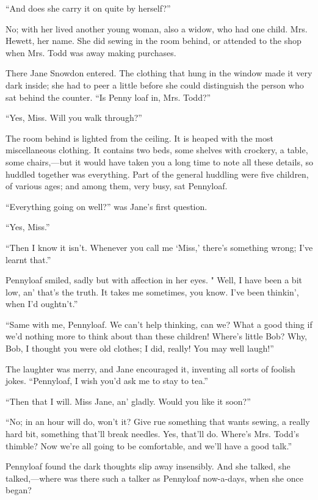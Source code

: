 ``And does she carry it on quite by herself?''

No; with her lived another young woman, also a widow, who had one child.
Mrs. Hewett, her name. She did sewing in the room behind, or attended to
the shop when Mrs. Todd was away making purchases.

There Jane Snowdon entered. The clothing that hung in the window made it
very dark inside; she had to peer a little before she could distinguish
the person who sat behind the counter. ``Is Penny loaf in, Mrs. Todd?''

``Yes, Miss. Will you walk through?''

The room behind is lighted from the ceiling. It is heaped with the most
miscellaneous clothing. It contains two beds, some shelves with
crockery, a table, some chairs,---but it would have taken you a long
time to note all these {}details, so huddled together was everything.
Part of the general huddling were five children, of various ages; and
among them, very busy, sat Pennyloaf.

``Everything going on well?'' was Jane's first question.

``Yes, Miss.''

``Then I know it isn't. Whenever you call me `Miss,' there's something
wrong; I've learnt that.''

Pennyloaf smiled, sadly but with affection in her eyes. " Well, I have
been a bit low, an' that's the truth. It takes me sometimes, you know.
I've been thinkin', when I'd oughtn't.''

``Same with me, Pennyloaf. We can't help thinking, can we? What a good
thing if we'd nothing more to think about than these children! Where's
little Bob? Why, Bob, I thought you were old clothes; I did, really! You
may well laugh!''

The laughter was merry, and Jane encouraged it, inventing all sorts of
foolish jokes. ``Pennyloaf, I wish you'd ask me to stay to tea.''

``Then that I will. Miss Jane, an' gladly. Would you like it soon?''

``No; in an hour will do, won't it? Give {}rue something that wants
sewing, a really hard bit, something that'll break needles. Yes, that'll
do. Where's Mrs. Todd's thimble? Now we're all going to be comfortable,
and we'll have a good talk.''

Pennyloaf found the dark thoughts slip away insensibly. And she talked,
she talked,---where was there such a talker as Pennyloaf now-a-days,
when she once began?

